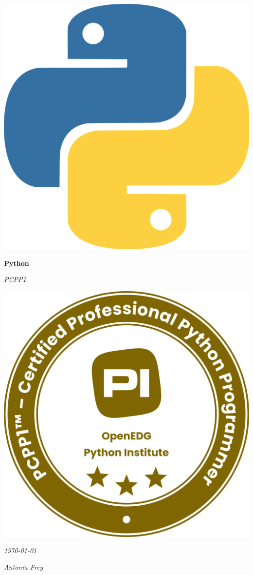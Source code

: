 \documentclass[11pt,a4paper,titlepage]{article}
\newcommand\blankpage{%
    \null
    \thispagestyle{empty}%
    \addtocounter{page}{-1}%
    \newpage}
\begin{document}
\begin{titlepage}
    \centering
    \vspace*{2cm}
    \includegraphics[width=0.2\linewidth]{images/python.png}\par
    \vspace{0.6cm}
    {\Huge\bfseries Python\par}
    \vspace{0.3cm}
    {\Large\itshape PCPP1\par}
    \vspace{1cm}
    \vfill
    \includegraphics[width=0.35\linewidth]{images/badge.png}\par
    \vspace{5cm}
    {\large\itshape \today\par}
    {\large\itshape Antonia Frey\par}
    \vspace*{2cm}
\end{titlepage}
\afterpage{\blankpage}

\setcounter{tocdepth}{2} %
\tableofcontents
\afterpage{\blankpage}








\end{document}
